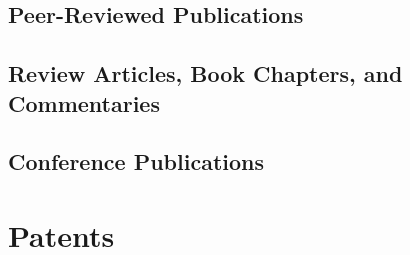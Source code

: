
\subsection*[Peer-Reviewed]{Peer-Reviewed Publications}
\begin{refsection}
\nocite{*}
\printbibliography[heading=none, locallabelwidth=true]
\end{refsection}

\subsection*[Review Articles, Book Chapters, and Commentaries]{Review Articles, Book Chapters, and Commentaries}
\begin{refsection}
\nocite{*}
\printbibliography[heading=none, locallabelwidth=true]
\end{refsection}

\subsection*[Conference]{Conference Publications}
\begin{refsection}
\nocite{*}
\printbibliography[heading=none, locallabelwidth=true]
\end{refsection}

\section*[Patents]{Patents \small{}}
\begin{refsection}
\nocite{*}
\printbibliography[heading=none, locallabelwidth=true]
\end{refsection}
